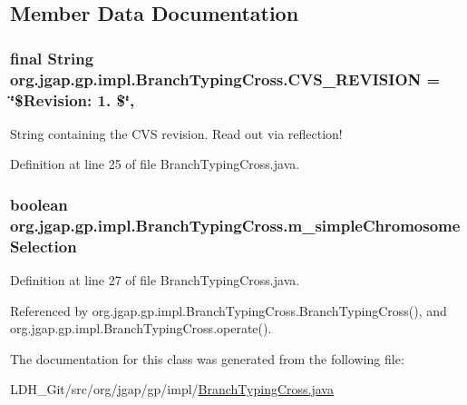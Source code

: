 \subsection{Member Data Documentation}
\hypertarget{classorg_1_1jgap_1_1gp_1_1impl_1_1_branch_typing_cross_a21c41aec2a5244c447fce04e787d2044}{
\subsubsection[{C\-V\-S\-\_\-\-R\-E\-V\-I\-S\-I\-O\-N}]{\setlength{\rightskip}{0pt plus 5cm}final String org.\-jgap.\-gp.\-impl.\-Branch\-Typing\-Cross.\-C\-V\-S\-\_\-\-R\-E\-V\-I\-S\-I\-O\-N = \char`\"{}\$Revision\-: 1. \$\char`\"{}\hspace{0.3cm}{\ttfamily [static]}, {\ttfamily [private]}}}\label{classorg_1_1jgap_1_1gp_1_1impl_1_1_branch_typing_cross_a21c41aec2a5244c447fce04e787d2044}
String containing the C\-V\-S revision. Read out via reflection! 

Definition at line 25 of file Branch\-Typing\-Cross.\-java.

\hypertarget{classorg_1_1jgap_1_1gp_1_1impl_1_1_branch_typing_cross_a8b02cfc725e59ad740b82f356924f437}{
\subsubsection[{m\-\_\-simple\-Chromosome\-Selection}]{\setlength{\rightskip}{0pt plus 5cm}boolean org.\-jgap.\-gp.\-impl.\-Branch\-Typing\-Cross.\-m\-\_\-simple\-Chromosome\-Selection\hspace{0.3cm}{\ttfamily [private]}}}\label{classorg_1_1jgap_1_1gp_1_1impl_1_1_branch_typing_cross_a8b02cfc725e59ad740b82f356924f437}


Definition at line 27 of file Branch\-Typing\-Cross.\-java.



Referenced by org.\-jgap.\-gp.\-impl.\-Branch\-Typing\-Cross.\-Branch\-Typing\-Cross(), and org.\-jgap.\-gp.\-impl.\-Branch\-Typing\-Cross.\-operate().



The documentation for this class was generated from the following file\-:\begin{DoxyCompactItemize}
\item 
L\-D\-H\-\_\-\-Git/src/org/jgap/gp/impl/\hyperlink{_branch_typing_cross_8java}{Branch\-Typing\-Cross.\-java}\end{DoxyCompactItemize}
